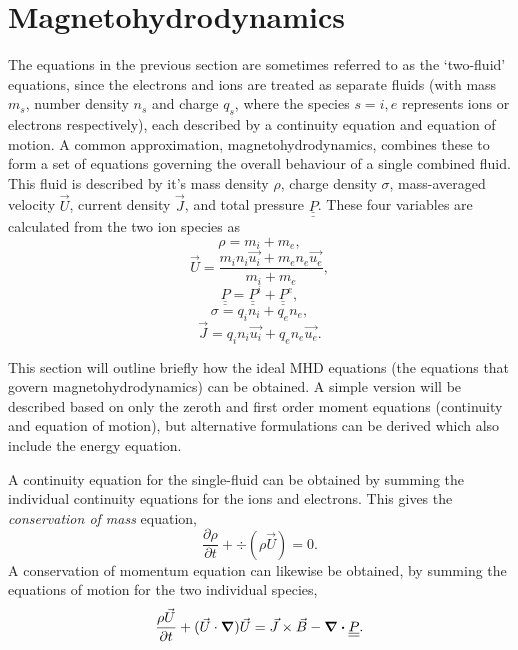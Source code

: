 \section{Magnetohydrodynamics}
The equations in the previous section are sometimes referred to as the `two-fluid' equations, since the electrons and ions are treated as separate fluids (with mass $m_s$, number density $n_s$ and charge $q_s$, where the species $s = i,e$ represents ions or electrons respectively), each described by a continuity equation and equation of motion. A common approximation, magnetohydrodynamics, combines these to form a set of equations governing the overall behaviour of a single combined fluid. This fluid is described by it's mass density $\rho$, charge density $\sigma$, mass-averaged velocity $\vec{U}$, current density $\vec{J}$, and total pressure $\underline{\underline{P}}$. These four variables are calculated from the two ion species as
\begin{equation} \rho = m_i + m_e,  \end{equation}
\begin{equation} \vec{U} = \frac{m_i n_i \vec{u_i} + m_e n_e \vec{u_e}}{ m_i + m_e},  \end{equation}
\begin{equation} \underline{\underline{P}} = \underline{\underline{P}}^i + \underline{\underline{P}}^e,  \end{equation}
\begin{equation} \sigma = q_i n_i + q_e n_e,  \end{equation}
\begin{equation} \vec{J} = q_i n_i \vec{u_i} + q_e n_e \vec{u_e}.  \end{equation}

This section will outline briefly how the ideal MHD equations (the equations that govern magnetohydrodynamics) can be obtained. A simple version will be described based on only the zeroth and first order moment equations (continuity and equation of motion), but alternative formulations can be derived which also include the energy equation. 

A continuity equation for the single-fluid can be obtained by summing the individual continuity equations for the ions and electrons. This gives the \textit{conservation of mass} equation,
\begin{equation} \frac{\partial \rho}{\partial t} + \div (\rho \vec{U}) = 0. \end{equation}
A conservation of momentum equation can likewise be obtained, by summing the equations of motion for the two individual species,
\begin{equation} \frac{\rho \vec{U}}{\partial t} + (\vec{U} \cdot \grad)\vec{U} =\vec{J} \times \vec{B} - \div \underline{\underline{P}} .\end{equation}

